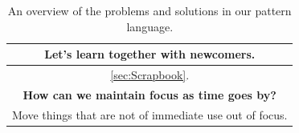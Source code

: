 \begin{table}
{\begin{tabularx}{\textwidth}{|C|}
Let's learn together with newcomers.
\vspace{.4em}\\
\hline
\vspace{-.4em} \color{Black} \ref{sec:Scrapbook}. \vspace{.4em}\\
\hline
\vspace{.01em}
\textbf{How can we maintain focus as time goes by?}\\
Move things that are not of immediate use out of focus.
\vspace{.4em}\\
\hline
\end{tabularx}
}
\smallskip
\caption{An overview of the problems and solutions in our pattern language.\label{tab:core}}
\end{table}

\FloatBarrier

\newpage

%  

  
